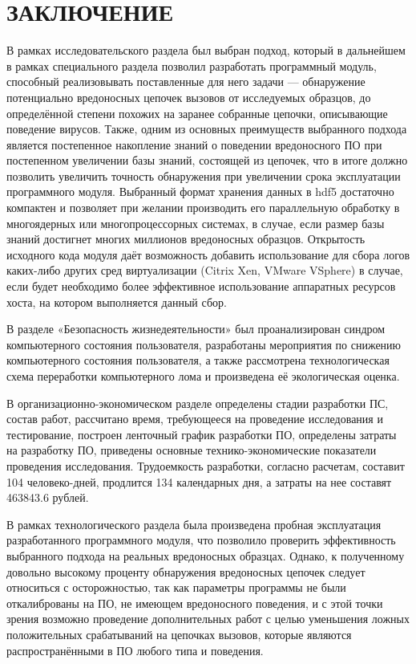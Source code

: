 \section* {ЗАКЛЮЧЕНИЕ}
В рамках исследовательского раздела был выбран подход, который в дальнейшем в рамках специального раздела позволил разработать программный модуль, способный реализовывать поставленные для него задачи --- обнаружение потенциально вредоносных цепочек вызовов от исследуемых образцов, до определённой степени похожих на заранее собранные цепочки, описывающие поведение вирусов. Также, одним из основных преимуществ выбранного подхода является постепенное накопление знаний о поведении вредоносного ПО при постепенном увеличении базы знаний, состоящей из цепочек, что в итоге должно позволить увеличить точность обнаружения при увеличении срока эксплуатации программного модуля. Выбранный формат хранения данных в hdf5 достаточно компактен и позволяет при желании производить его параллельную обработку в многоядерных или многопроцессорных системах, в случае, если размер базы знаний достигнет многих миллионов вредоносных образцов. Открытость исходного кода модуля даёт возможность добавить использование для сбора логов каких-либо других сред виртуализации (Citrix Xen, VMware VSphere) в случае, если будет необходимо более эффективное использование аппаратных ресурсов хоста, на котором выполняется данный сбор.

В разделе «Безопасность жизнедеятельности» был проанализирован синдром компьютерного состояния пользователя, разработаны мероприятия по снижению компьютерного состояния пользователя, а также рассмотрена технологическая схема переработки компьютерного лома и произведена её экологическая оценка.

В организационно-экономическом разделе определены стадии разработки ПС, состав работ, рассчитано время, требующееся на проведение исследования и тестирование, построен ленточный график разработки ПО, определены затраты на разработку ПО, приведены основные технико-экономические показатели проведения исследования. 
Трудоемкость разработки, согласно расчетам, составит 104 человеко-дней, продлится 134 календарных дня, а затраты на нее составят 463843.6 рублей.

В рамках технологического раздела была произведена пробная эксплуатация разработанного программного модуля, что позволило проверить эффективность выбранного подхода на реальных вредоносных образцах. Однако, к полученному довольно высокому проценту обнаружения вредоносных цепочек следует относиться с осторожностью, так как параметры программы не были откалиброваны на ПО, не имеющем вредоносного поведения, и с этой точки зрения возможно проведение дополнительных работ с целью уменьшения ложных положительных срабатываний на цепочках вызовов, которые являются распространёнными в ПО любого типа и поведения.

